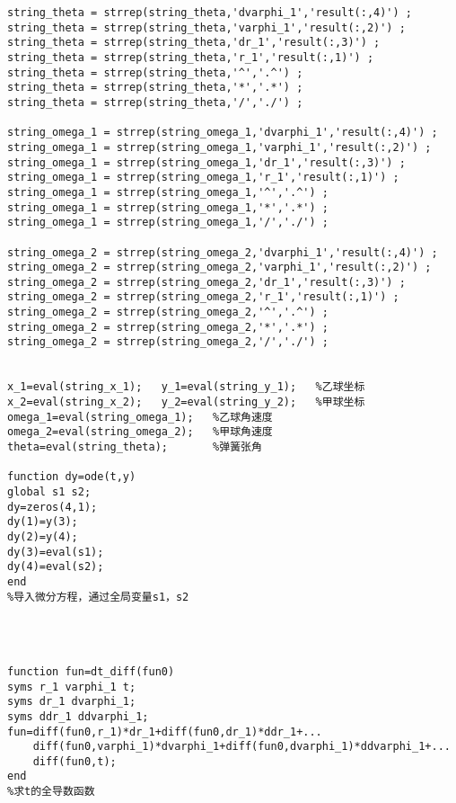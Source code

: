 \documentclass[a4paper,c5size,twoside,UTF8]{ctexart} %
\numberwithin{equation}{section}   %
\begin{document}
\begin{lstlisting}
string_theta = strrep(string_theta,'dvarphi_1','result(:,4)') ;
string_theta = strrep(string_theta,'varphi_1','result(:,2)') ;
string_theta = strrep(string_theta,'dr_1','result(:,3)') ;
string_theta = strrep(string_theta,'r_1','result(:,1)') ;
string_theta = strrep(string_theta,'^','.^') ;
string_theta = strrep(string_theta,'*','.*') ;
string_theta = strrep(string_theta,'/','./') ;

string_omega_1 = strrep(string_omega_1,'dvarphi_1','result(:,4)') ;
string_omega_1 = strrep(string_omega_1,'varphi_1','result(:,2)') ;
string_omega_1 = strrep(string_omega_1,'dr_1','result(:,3)') ;
string_omega_1 = strrep(string_omega_1,'r_1','result(:,1)') ;
string_omega_1 = strrep(string_omega_1,'^','.^') ;
string_omega_1 = strrep(string_omega_1,'*','.*') ;
string_omega_1 = strrep(string_omega_1,'/','./') ;

string_omega_2 = strrep(string_omega_2,'dvarphi_1','result(:,4)') ;
string_omega_2 = strrep(string_omega_2,'varphi_1','result(:,2)') ;
string_omega_2 = strrep(string_omega_2,'dr_1','result(:,3)') ;
string_omega_2 = strrep(string_omega_2,'r_1','result(:,1)') ;
string_omega_2 = strrep(string_omega_2,'^','.^') ;
string_omega_2 = strrep(string_omega_2,'*','.*') ;
string_omega_2 = strrep(string_omega_2,'/','./') ;


x_1=eval(string_x_1);   y_1=eval(string_y_1);   %乙球坐标
x_2=eval(string_x_2);   y_2=eval(string_y_2);   %甲球坐标
omega_1=eval(string_omega_1);   %乙球角速度
omega_2=eval(string_omega_2);   %甲球角速度
theta=eval(string_theta);       %弹簧张角

function dy=ode(t,y)
global s1 s2;
dy=zeros(4,1);
dy(1)=y(3);
dy(2)=y(4);
dy(3)=eval(s1);
dy(4)=eval(s2);
end
%导入微分方程，通过全局变量s1，s2




function fun=dt_diff(fun0)
syms r_1 varphi_1 t;
syms dr_1 dvarphi_1;
syms ddr_1 ddvarphi_1;
fun=diff(fun0,r_1)*dr_1+diff(fun0,dr_1)*ddr_1+...
    diff(fun0,varphi_1)*dvarphi_1+diff(fun0,dvarphi_1)*ddvarphi_1+...
    diff(fun0,t);
end
%求t的全导数函数
\end{lstlisting}
\end{document}
